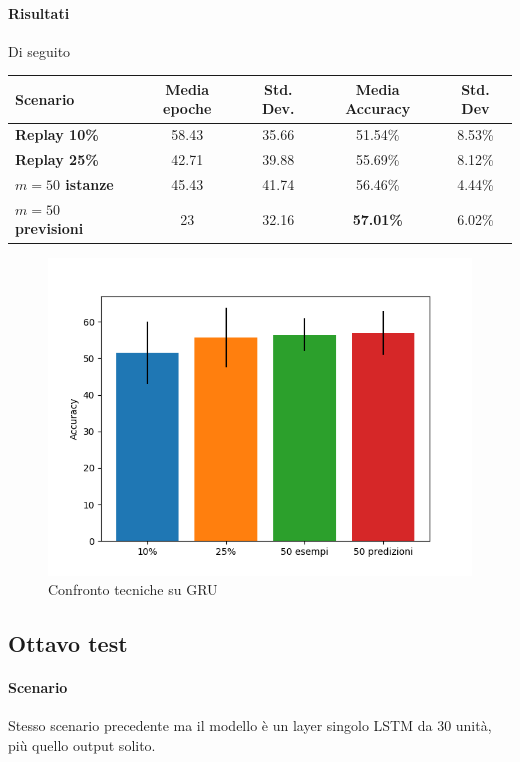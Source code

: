\documentclass[11pt, a4paper, twoside, openright]{book}
\begin{document}
\paragraph{Risultati} Di seguito\\
\begin{tabular}{l|c|c|c|c}
    \textbf{Scenario} & \textbf{Media epoche} & \textbf{Std. Dev.} & \textbf{Media Accuracy} & \textbf{Std. Dev} \\
    \hline 
    \textbf{Replay 10\%} & 58.43 & 35.66 & 51.54\% & 8.53\% \\
    \textbf{Replay 25\%} & 42.71 & 39.88 & 55.69\% & 8.12\%\\
    \textbf{$m = 50$ istanze} & 45.43 & 41.74 & 56.46\% & 4.44\%\\
    \textbf{$m = 50$ previsioni} & 23 & 32.16 & \textbf{57.01\%} & 6.02\%\\
\end{tabular}
\begin{figure}
    \centering
    \includegraphics[scale=0.75]{img/seventh.png}
    \caption{Confronto tecniche su GRU}
    \label{fig:seventh}
\end{figure}
\subsection{Ottavo test}
\paragraph{Scenario} Stesso scenario precedente ma il modello è un layer singolo LSTM da 30 unità, più quello output solito.
\end{document}
